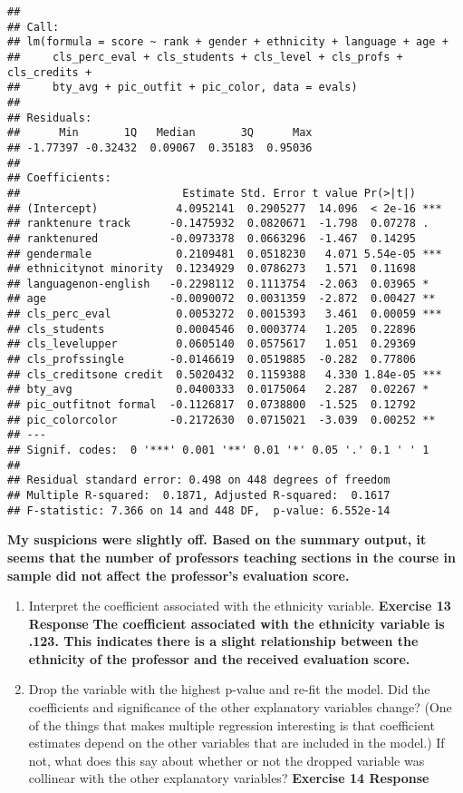 \documentclass[
]{article}
\begin{document}
\begin{verbatim}
## 
## Call:
## lm(formula = score ~ rank + gender + ethnicity + language + age + 
##     cls_perc_eval + cls_students + cls_level + cls_profs + cls_credits + 
##     bty_avg + pic_outfit + pic_color, data = evals)
## 
## Residuals:
##      Min       1Q   Median       3Q      Max 
## -1.77397 -0.32432  0.09067  0.35183  0.95036 
## 
## Coefficients:
##                         Estimate Std. Error t value Pr(>|t|)    
## (Intercept)            4.0952141  0.2905277  14.096  < 2e-16 ***
## ranktenure track      -0.1475932  0.0820671  -1.798  0.07278 .  
## ranktenured           -0.0973378  0.0663296  -1.467  0.14295    
## gendermale             0.2109481  0.0518230   4.071 5.54e-05 ***
## ethnicitynot minority  0.1234929  0.0786273   1.571  0.11698    
## languagenon-english   -0.2298112  0.1113754  -2.063  0.03965 *  
## age                   -0.0090072  0.0031359  -2.872  0.00427 ** 
## cls_perc_eval          0.0053272  0.0015393   3.461  0.00059 ***
## cls_students           0.0004546  0.0003774   1.205  0.22896    
## cls_levelupper         0.0605140  0.0575617   1.051  0.29369    
## cls_profssingle       -0.0146619  0.0519885  -0.282  0.77806    
## cls_creditsone credit  0.5020432  0.1159388   4.330 1.84e-05 ***
## bty_avg                0.0400333  0.0175064   2.287  0.02267 *  
## pic_outfitnot formal  -0.1126817  0.0738800  -1.525  0.12792    
## pic_colorcolor        -0.2172630  0.0715021  -3.039  0.00252 ** 
## ---
## Signif. codes:  0 '***' 0.001 '**' 0.01 '*' 0.05 '.' 0.1 ' ' 1
## 
## Residual standard error: 0.498 on 448 degrees of freedom
## Multiple R-squared:  0.1871, Adjusted R-squared:  0.1617 
## F-statistic: 7.366 on 14 and 448 DF,  p-value: 6.552e-14
\end{verbatim}

\textbf{My suspicions were slightly off. Based on the summary output, it
seems that} \textbf{the number of professors teaching sections in the
course in sample did not} \textbf{affect the professor's evaluation
score.}

\begin{enumerate}
\def\labelenumi{\arabic{enumi}.}
\setcounter{enumi}{12}
\item
  Interpret the coefficient associated with the ethnicity variable.
  \textbf{Exercise 13 Response} \textbf{The coefficient associated with
  the ethnicity variable is .123. This indicates} \textbf{there is a
  slight relationship between the ethnicity of the professor and the}
  \textbf{received evaluation score.}
\item
  Drop the variable with the highest p-value and re-fit the model. Did
  the coefficients and significance of the other explanatory variables
  change? (One of the things that makes multiple regression interesting
  is that coefficient estimates depend on the other variables that are
  included in the model.) If not, what does this say about whether or
  not the dropped variable was collinear with the other explanatory
  variables? \textbf{Exercise 14 Response}
\end{enumerate}
\end{document}
